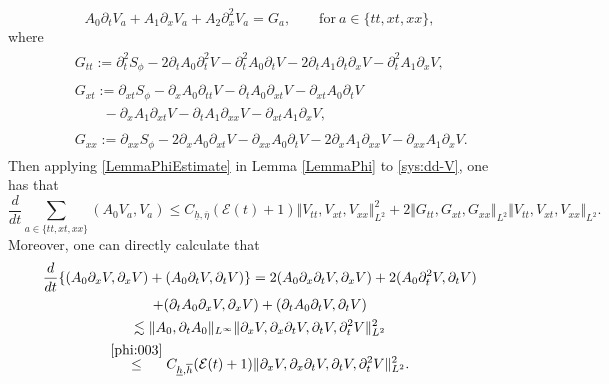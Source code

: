\documentclass[reqno,11pt]{amsart}
\newcommand{\norm}[2]{\Vert #1 \Vert_{#2}}
\theoremstyle{plain}
\theoremstyle{definition}
\numberwithin{equation}{section}
\begin{document}
\begin{equation}
    \label{sys:dd-V}
    A_0 \partial_t V_{a} + A_1 \partial_x V_{a} + A_2 \partial_{x}^2  V_a = G_a, \qquad \text{for} ~ a \in \lbrace tt, xt, xx\rbrace,
\end{equation}
where
\begin{align}
    \label{id:tt-G}
    & \begin{aligned}
     & G_{tt} := \partial_{t}^2 S_\phi - 2 \partial_t A_0 \partial_{t}^2 V - \partial_{t}^2 A_0 \partial_t V - 2 \partial_t A_1 \partial_t\partial_{x}V- \partial_{t}^2 A_1 \partial_x V,
    \end{aligned}
    \\
    & \begin{aligned}
        & G_{xt} := \partial_{xt} S_\phi - \partial_x A_0 \partial_{tt} V - \partial_t A_0 \partial_{xt} V - \partial_{xt} A_0 \partial_t V \\
        & \qquad - \partial_x A_1 \partial_{xt}V - \partial_{t} A_1 \partial_{xx} V - \partial_{xt} A_1 \partial_x V, 
    \end{aligned}
    \label{id:xt_G}
    \\
    \label{id:xx_G}
    & \begin{aligned}
        & G_{xx} := \partial_{xx} S_\phi - 2 \partial_x A_0 \partial_{xt} V - \partial_{xx}A_0 \partial_t V - 2 \partial_x A_1 \partial_{xx} V - \partial_{xx} A_1 \partial_x V. 
    \end{aligned}
\end{align}
Then applying \eqref{LemmaPhiEstimate} in Lemma \ref{LemmaPhi} to \eqref{sys:dd-V}, one has that
\begin{equation}
    \label{h2:001}
    \dfrac{d}{dt} \sum_{a \in \lbrace tt, xt, xx\rbrace} (A_0 V_a, V_a) \leq C_{\underline h, \overline{\eta}} (\mathcal E(t) + 1) \norm{V_{tt}, V_{xt}, V_{xx}}{L^2}^2 + 2\norm{G_{tt},G_{xt},G_{xx}}{L^2} \norm{V_{tt}, V_{xt}, V_{xx}}{L^2}. 
\end{equation}
Moreover, one can directly calculate that 
\begin{equation}
\label{h-1-eq}
\begin{gathered}
    \dfrac{d}{dt}\lbrace (A_0 \partial_x V, \partial_x V) + (A_0 \partial_t V, \partial_t V) \rbrace = 2 (A_0 \partial_{x}\partial_t V, \partial_x V) + 2 (A_0 \partial_{t}^2 V, \partial_t V) \\ + (\partial_t A_0 \partial_x V, \partial_x V) + (\partial_t A_0 \partial_t V,\partial_t V)\\
    \lesssim \norm{A_0,\partial_t A_0}{L^\infty} \norm{\partial_x V, \partial_{x}\partial_tV,\partial_{t}V,\partial_{t}^2 V}{L^2}^2 \\
    \overset{\eqref{phi:003}}{\leq} C_{\underline h, \overline h} (\mathcal E(t) + 1)\norm{\partial_x V, \partial_{x}\partial_tV,\partial_{t}V,\partial_{t}^2 V}{L^2}^2.
    \end{gathered}
\end{equation}
\end{document}
